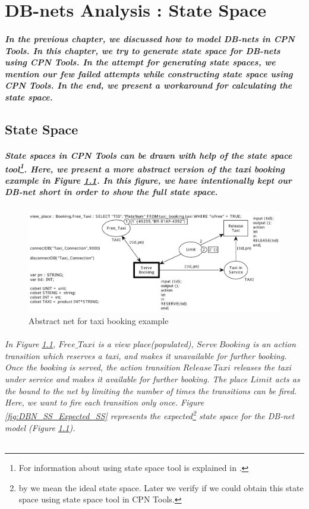 \graphicspath{{./images/DBN_SS/}}
\chapter{DB-nets Analysis : State Space}
\label{ch:DBN_SS}
\paragraph*{\textnormal{In the previous chapter, we discussed how to model DB-nets in CPN Tools. In this chapter, we try to generate state space for DB-nets using CPN Tools. In the attempt for generating state spaces, we mention our few failed attempts while constructing state space using CPN Tools. In the end, we present a workaround for calculating the state space.}}
\section{State Space}
\label{sec:DBN_SS_State_Space}
\paragraph*{\textnormal{State spaces in CPN Tools can be drawn with help of the state space tool\footnote{For information about using state space tool is explained in \cite{CPN_Tools_State_Space}.}. Here, we present a more abstract version of the taxi booking example in Figure \ref{fig:DBN_SS_Faulty_Net}. In this figure, we have intentionally kept our DB-net short in order to show the full state space.}}

\begin{figure}[!htbp]
	\centering
	\includegraphics[scale = 0.40]{DBN_SS_Faulty_Net.pdf}
	\caption{Abstract net for taxi booking example}
	\label{fig:DBN_SS_Faulty_Net}
\end{figure}

\subparagraph*{\textnormal{In Figure \ref{fig:DBN_SS_Faulty_Net}, $\mathit{Free\_Taxi}$ is a view place(populated), $\mathit{Serve\ Booking}$ is an action transition which reserves a taxi, and makes it unavailable for further booking. Once the booking is served, the action transition $\mathit{Release\ Taxi}$ releases the taxi under service and makes it available for further booking. The place $\mathit{Limit}$ acts as the bound to the net by limiting the number of times the transitions can be fired. Here, we want to fire each transition only once. Figure \ref{fig:DBN_SS_Expected_SS} represents the expected\footnote{by  we mean the ideal state space. Later we verify if we could obtain this state space using state space tool in CPN Tools.} state space for the DB-net model (Figure \ref{fig:DBN_SS_Faulty_Net}).}}

